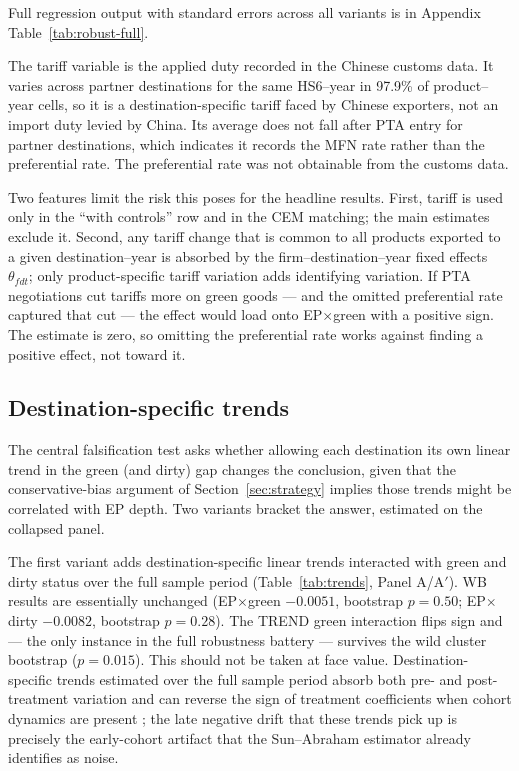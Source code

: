 \documentclass[12pt]{article}
\begin{document}
\begin{table}[htbp]
\centering
\caption{Sample robustness (full firm-level panel, WB index)}
\label{tab:robust}

\end{table}

Full regression output with standard errors across all variants is in Appendix Table~\ref{tab:robust-full}.

The tariff variable is the applied duty recorded in the Chinese customs data. It varies
across partner destinations for the same HS6--year in 97.9\% of product--year cells,
so it is a destination-specific tariff faced by Chinese exporters, not an import duty
levied by China. Its average does not fall after PTA entry for partner destinations,
which indicates it records the MFN rate rather than the preferential rate. The
preferential rate was not obtainable from the customs data.

Two features limit the risk this poses for the headline results. First, tariff is used
only in the ``with controls'' row and in the CEM matching; the main estimates exclude
it. Second, any tariff change that is common to all products exported to a given
destination--year is absorbed by the firm--destination--year fixed effects $\theta_{fdt}$;
only product-specific tariff variation adds identifying variation. If PTA negotiations
cut tariffs more on green goods --- and the omitted preferential rate captured that
cut --- the effect would load onto EP$\times$green with a positive sign. The estimate
is zero, so omitting the preferential rate works against finding a positive effect, not
toward it.

\subsection{Destination-specific trends}

The central falsification test asks whether allowing each destination its own linear
trend in the green (and dirty) gap changes the conclusion, given that the conservative-bias
argument of Section~\ref{sec:strategy} implies those trends might be correlated with EP
depth. Two variants bracket the answer, estimated on the collapsed panel.

The first variant adds destination-specific linear trends interacted with green and dirty status
over the full sample period (Table~\ref{tab:trends}, Panel A/A$'$). WB results are essentially unchanged (EP$\times$green
$-0.0051$, bootstrap $p = 0.50$; EP$\times$dirty $-0.0082$, bootstrap $p = 0.28$). The
TREND green interaction flips sign and --- the only instance in the full robustness
battery --- survives the wild cluster bootstrap ($p = 0.015$). This should not be taken at face
value. Destination-specific trends estimated over the full sample period absorb both pre- and post-treatment variation and can reverse the sign of treatment coefficients when cohort dynamics are present \citep{wolfers2006}; the late negative drift that these trends pick
up is precisely the early-cohort artifact that the Sun--Abraham estimator already
identifies as noise.
\end{document}
